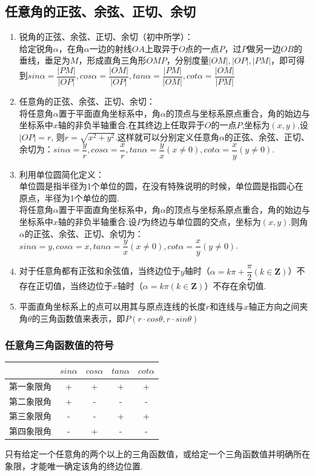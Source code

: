 \subsection*{任意角的正弦、余弦、正切、余切}
\begin{enumerate}
    \item 锐角的正弦、余弦、正切、余切（初中所学）：\\
    给定锐角$\alpha$，在角$\alpha$一边的射线$OA$上取异于$O$点的一点$P$，过$P$做另一边$OB$的垂线，垂足为$M$，形成直角三角形$OMP$，分别度量$|OM|, |OP|, |PM|$，即可得到$sin\alpha = \dfrac{|PM|}{|OP|}, cos\alpha = \dfrac{|OM|}{|OP|}, tan\alpha = \dfrac{|PM|}{|OM|}, cot\alpha = \dfrac{|OM|}{|PM|}$ 
    \item 任意角的正弦、余弦、正切、余切：\\
    将任意角$\alpha$置于平面直角坐标系中，角$\alpha$的顶点与坐标系原点重合，角的始边与坐标系中$x$轴的非负半轴重合.在其终边上任取异于$O$的一点$P$,坐标为$(x,y)$,设$|OP| = r$, 则$r = \sqrt{x^2+y^2}$.这样就可以分别定义任意角$\alpha$的正弦、余弦、正切、余切为：$sin\alpha = \dfrac{y}{r}, cos\alpha = \dfrac{x}{r}, tan\alpha = \dfrac{y}{x}(x \neq 0), cot\alpha = \dfrac{x}{y}(y \neq 0)$.
    \item 利用单位圆简化定义：\\
    单位圆是指半径为1个单位的圆，在没有特殊说明的时候，单位圆是指圆心在原点，半径为1个单位的圆.\\
    将任意角$\alpha$置于平面直角坐标系中，角$\alpha$的顶点与坐标系原点重合，角的始边与坐标系中$x$轴的非负半轴重合.设$P$为终边与单位圆的交点，坐标为$(x,y)$.则角$\alpha$的正弦、余弦、正切、余切为：$sin\alpha = y, cos\alpha = x, tan\alpha = \dfrac{y}{x}(x \neq 0), cot\alpha = \dfrac{x}{y}(y \neq 0)$.
    \item 对于任意角都有正弦和余弦值，当终边位于$y$轴时（$\alpha = k\pi + \dfrac{\pi}{2} (k \in \mathbf{Z})$）不存在正切值，当终边位于$x$轴时（$\alpha = k\pi (k \in \mathbf{Z})$）不存在余切值.
    \item 平面直角坐标系上的点可以用其与原点连线的长度$r$和连线与$x$轴正方向之间夹角$\theta$的三角函数值来表示，即$P(r \cdot cos\theta, r\cdot sin\theta)$
\end{enumerate}
\subsubsection*{任意角三角函数值的符号}
\begin{table}[h]
    \centering
    \begin{tabular}{c|cccc}
        \hline
         & $sin\alpha$ & $cos\alpha$ & $tan\alpha$ & $cot\alpha$ \\
        \hline
       第一象限角  & + & + & + & + \\
       第二象限角  & + & - & - & - \\
       第三象限角  & - & - & + & + \\
       第四象限角  & - & + & - & - \\
       \hline
    \end{tabular}
\end{table}
只有给定一个任意角的两个以上的三角函数值，或给定一个三角函数值并明确所在象限，才能唯一确定该角的终边位置.
